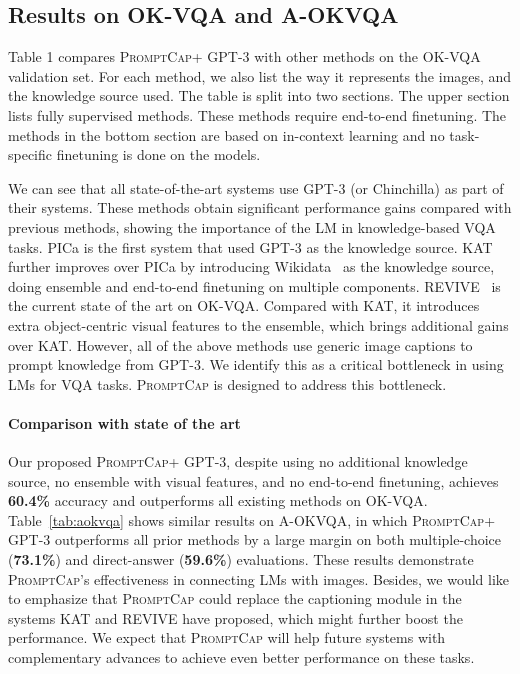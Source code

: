 \documentclass[10pt,twocolumn,letterpaper]{article}
\newcommand{\NAME}{\textsc{PromptCap}\xspace}
\begin{document}
\subsection{Results on OK-VQA and A-OKVQA}





Table 1 compares \NAME + GPT-3 with other methods on the OK-VQA validation set. For each method, we also list the way it represents the images, and the knowledge source used. The table is split into two sections. The upper section lists fully supervised methods. These methods require end-to-end finetuning. The methods in the bottom section are based on in-context learning and no task-specific finetuning is done on the models. 


We can see that all state-of-the-art systems use GPT-3 (or Chinchilla) as part of their systems. These methods obtain significant performance gains compared with previous methods, showing the importance of the LM in knowledge-based VQA tasks. 
PICa is the first system that used GPT-3 as the knowledge source. KAT~\cite{gui2022kat} further improves over PICa by introducing Wikidata~\cite{vrandevcic2014wikidata} as the knowledge source, doing ensemble and end-to-end finetuning on multiple components.
REVIVE~\cite{Lin2022REVIVERV} is the current state of the art on OK-VQA. Compared with KAT, it introduces extra object-centric visual features to the ensemble, which brings additional gains over KAT. However, all of the above methods use generic image captions to prompt knowledge from GPT-3. We identify this as a critical bottleneck in using LMs for VQA tasks. \NAME is designed to address this bottleneck.

\vspace{-0.1in}
\paragraph{Comparison with state of the art} Our proposed \NAME + GPT-3, despite using no additional knowledge source, no ensemble with visual features, and no end-to-end finetuning, achieves \textbf{60.4\%} accuracy and outperforms all existing methods on OK-VQA. Table~\ref{tab:aokvqa} shows similar results on A-OKVQA, in which \NAME + GPT-3 outperforms all prior methods by a large margin on both multiple-choice (\textbf{73.1\%}) and direct-answer (\textbf{59.6\%}) evaluations. These results demonstrate \NAME's effectiveness in connecting LMs with images. Besides, we would like to emphasize that \NAME could replace the captioning module in the systems KAT and REVIVE have proposed, which might further boost the performance. We expect that \NAME will help future systems with complementary advances to achieve even better performance on these tasks.
\end{document}
